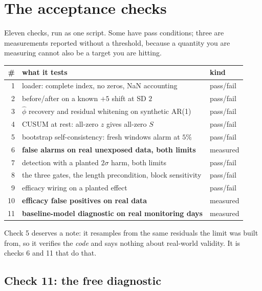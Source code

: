 \documentclass{article}
\theoremstyle{plain}
\theoremstyle{definition}
\theoremstyle{remark}
\numberwithin{equation}{section}
\begin{document}
\section{The acceptance checks}

Eleven checks, run as one script. Some have pass conditions; three are
measurements reported without a threshold, because a quantity you are
measuring cannot also be a target you are hitting.

\begin{center}
\begin{tabular}{rll}
\# & what it tests & kind \\
\hline
1 & loader: complete index, no zeros, NaN accounting & pass/fail \\
2 & before/after on a known $+5$ shift at SD $2$ & pass/fail \\
3 & $\hat\phi$ recovery and residual whitening on synthetic AR(1) & pass/fail \\
4 & CUSUM at rest: all-zero $z$ gives all-zero $S$ & pass/fail \\
5 & bootstrap self-consistency: fresh windows alarm at $5\%$ & pass/fail \\
6 & \textbf{false alarms on real unexposed data, both limits} & measured \\
7 & detection with a planted $2\sigma$ harm, both limits & pass/fail \\
8 & the three gates, the length precondition, block sensitivity & pass/fail \\
9 & efficacy wiring on a planted effect & pass/fail \\
10 & \textbf{efficacy false positives on real data} & measured \\
11 & \textbf{baseline-model diagnostic on real monitoring days} & measured \\
\end{tabular}
\end{center}

Check 5 deserves a note: it resamples from the same residuals the limit was
built from, so it verifies the \emph{code} and says nothing about real-world
validity. It is checks 6 and 11 that do that.

\subsection{Check 11: the free diagnostic}
\label{sec:diagnostic}
\end{document}
